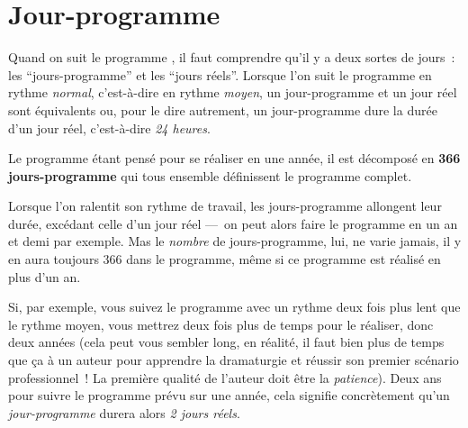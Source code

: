 % 
% 
% 
% 
% 
% 
% 
% 

\section{Jour-programme}\hypertarget{explicationjourprogrammejourreel}{}\label{explicationjourprogrammejourreel}

Quand on suit le programme \unan{}, il faut comprendre qu'il y a deux sortes de jours~{}: les ``jours-programme'' et les ``jours réels''. Lorsque l'on suit le programme en rythme \emph{normal}, c'est-à-dire en rythme \emph{moyen}, un jour-programme et un jour réel sont équivalents ou, pour le dire autrement, un jour-programme dure la durée d'un jour réel, c'est-à-dire \emph{24 heures}.

Le programme \unan{} étant pensé pour se réaliser en une année, il est décomposé en \textbf{366 jours-programme} qui tous ensemble définissent le programme complet.

Lorsque l'on ralentit son rythme de travail, les jours-programme allongent leur durée, excédant celle d'un jour réel —~{}on peut alors faire le programme \unan{} en un an et demi par exemple. Mas le \emph{nombre} de jours-programme, lui, ne varie jamais, il y en aura toujours 366 dans le programme, même si ce programme est réalisé en plus d'un an.

Si, par exemple, vous suivez le programme \unan{} avec un rythme deux fois plus lent que le rythme moyen, vous mettrez deux fois plus de temps pour le réaliser, donc deux années (cela peut vous sembler long, en réalité, il faut bien plus de temps que ça à un auteur pour apprendre la dramaturgie et réussir son premier scénario professionnel~{}! La première qualité de l'auteur doit être la \emph{patience}). Deux ans pour suivre le programme prévu sur une année, cela signifie concrètement qu'un \emph{jour-programme} durera alors \emph{2 jours réels}.

